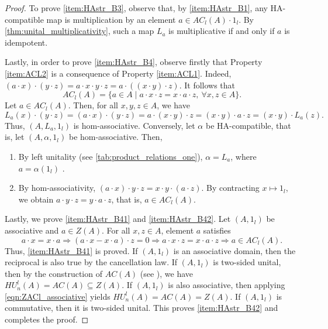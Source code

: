 \documentclass[12pt]{article}
\begin{document}
\begin{proof}
			
			To prove \ref{item:HAstr_B3}, observe that, by \ref{item:HAstr_B1}, any HA-compatible map is multiplication by an element $a\in AC_l(A)\cdot 1_l$. By \cref{thm:unital_multiplicativity}, such a map $L_a$ is multiplicative if and only if $a$ is idempotent.

			Lastly, in order to prove \ref{item:HAstr_B4}, observe firstly that Property \ref{item:ACL2} is a consequence of Property \ref{item:ACL1}. Indeed, $(a\cdot x)\cdot (y\cdot z)=a\cdot x\cdot y\cdot z=a\cdot ((x\cdot y)\cdot z)$. It follows that
			\begin{equation*}
				AC_l(A)=\{a\in A\mid a\cdot x\cdot z=x\cdot a\cdot z,\ \forall x,z\in A\}.
			\end{equation*}
			Let $a\in AC_l(A)$. Then, for all $x,y,z\in A$, we have
			\begin{equation*}
				L_a(x)\cdot (y\cdot z)=(a\cdot x)\cdot (y\cdot z)=a\cdot (x\cdot y)\cdot z=(x\cdot y)\cdot a\cdot z=(x\cdot y)\cdot L_a(z).
			\end{equation*}
			Thus, $(A,L_a,1_l)$ is hom-associative. Conversely, let $\alpha$ be HA-compatible, that is, let $(A,\alpha,1_l)$ be hom-associative. Then,
			\begin{enumerate}
				\item By left unitality (see \cref{tab:product_relations_one}), $\alpha=L_{a}$, where $a=\alpha(1_l)$ .
				\item By hom-associativity, $(a\cdot x)\cdot y\cdot z=x\cdot y\cdot (a\cdot z)$. By contracting $x\mapsto 1_l$, we obtain $a\cdot y\cdot z=y\cdot a\cdot z$, that is, $a\in AC_l(A)$.
			\end{enumerate}
			
            Lastly, we prove \ref{item:HAstr_B41} and \ref{item:HAstr_B42}. Let $(A,1_l)$ be associative and $a\in Z(A)$. For all $x,z\in A$, element $a$ satisfies
			\begin{equation}\label{eqn:ZACl_associative}
				a\cdot x=x\cdot a\Rightarrow (a\cdot x-x\cdot a)\cdot z=0\Rightarrow a\cdot x\cdot z=x\cdot a\cdot z\Rightarrow a\in AC_l(A).
			\end{equation}
			Thus, \ref{item:HAstr_B41} is proved. If $(A,1_l)$ is an associative domain, then the reciprocal is also true by the cancellation law. 	
			If $(A,1_l)$ is two-sided unital, then by the construction of $AC(A)$ (see \cite{FreGohr:UnitCond}), we have $HU_n^l(A)=AC(A)\subseteq Z(A)$. If $(A,1_l)$ is also associative, then applying \eqref{eqn:ZACl_associative} yields $HU_n^l(A)=AC(A)=Z(A)$. If $(A,1_l)$ is commutative, then it is two-sided unital. This proves \ref{item:HAstr_B42} and completes the proof.

			
		\end{proof}
		
\end{document}
